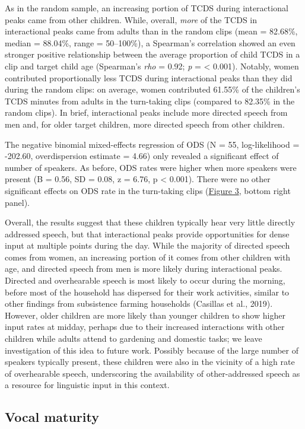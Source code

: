 \documentclass[,man,floatsintext]{apa6}
\begin{document}
As in the random sample, an increasing portion of TCDS during
interactional peaks came from other children. While, overall,
\emph{more} of the TCDS in interactional peaks came from adults than in
the random clips (mean = 82.68\%, median = 88.04\%, range = 50--100\%),
a Spearman's correlation showed an even stronger positive relationship
between the average proportion of child TCDS in a clip and target child
age (Spearman's \emph{rho} = 0.92; \emph{p} = \textless{} 0.001).
Notably, women contributed proportionally less TCDS during interactional
peaks than they did during the random clips: on average, women
contributed 61.55\% of the children's TCDS minutes from adults in the
turn-taking clips (compared to 82.35\% in the random clips). In brief,
interactional peaks include more directed speech from men and, for older
target children, more directed speech from other children.

The negative binomial mixed-effects regression of ODS (N = 55,
log-likelihood = -202.60, overdispersion estimate = 4.66) only revealed
a significant effect of number of speakers. As before, ODS rates were
higher when more speakers were present (B = 0.56, SD = 0.08, z = 6.76, p
\textless{} 0.001). There were no other significant effects on ODS rate
in the turn-taking clips (\protect\hyperlink{fig3}{Figure 3}, bottom
right panel).

Overall, the results suggest that these children typically hear very
little directly addressed speech, but that interactional peaks provide
opportunities for dense input at multiple points during the day. While
the majority of directed speech comes from women, an increasing portion
of it comes from other children with age, and directed speech from men
is more likely during interactional peaks. Directed and overhearable
speech is most likely to occur during the morning, before most of the
household has dispersed for their work activities, similar to other
findings from subsistence farming households (Casillas et al., 2019).
However, older children are more likely than younger children to show
higher input rates at midday, perhaps due to their increased
interactions with other children while adults attend to gardening and
domestic tasks; we leave investigation of this idea to future work.
Possibly because of the large number of speakers typically present,
these children were also in the vicinity of a high rate of overhearable
speech, underscoring the availability of other-addressed speech as a
resource for linguistic input in this context.

\subsection{Vocal maturity}\label{vocal-maturity}
\end{document}
